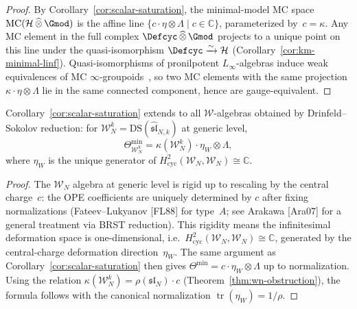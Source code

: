 \begin{proof}
By Corollary~\ref{cor:scalar-saturation}, the minimal-model MC
space $\mathrm{MC}(\mathcal{H} \,\widehat{\otimes}\, \Gmod)$
is the affine line
$\{c \cdot \eta \otimes \Lambda \mid c \in \mathbb{C}\}$,
parameterized by~$c = \kappa$.
Any MC element in the full complex
$\Defcyc \,\widehat{\otimes}\, \Gmod$ projects to a unique point
on this line under the quasi-isomorphism
$\Defcyc \xrightarrow{\sim} \mathcal{H}$
(Corollary~\ref{cor:km-minimal-linf}).
Quasi-isomorphisms of pronilpotent $L_\infty$-algebras induce
weak equivalences of MC $\infty$-groupoids~\cite{Get09},
so two MC elements with the same projection
$\kappa \cdot \eta \otimes \Lambda$ lie in the same connected
component, hence are gauge-equivalent.
\end{proof}

\begin{proposition}
\label{prop:w-algebra-scalar-saturation}
Corollary~\textup{\ref{cor:scalar-saturation}} extends to all
$\mathcal{W}$-algebras obtained by Drinfeld--Sokolov reduction:
for $\mathcal{W}_N^k = \mathrm{DS}(\widehat{\mathfrak{sl}}_{N,k})$
at generic level,
\[
\Theta_{\mathcal{W}_N^k}^{\min}
= \kappa(\mathcal{W}_N^k) \cdot \eta_W \otimes \Lambda,
\]
where $\eta_W$ is the unique generator of
$H^2_{\mathrm{cyc}}(\mathcal{W}_N, \mathcal{W}_N) \cong \mathbb{C}$.
\end{proposition}

\begin{proof}
The $\mathcal{W}_N$ algebra at generic level is rigid up to
rescaling by the central charge~$c$: the OPE coefficients are
uniquely determined by $c$ after fixing normalizations
\textup{(}Fateev--Lukyanov \textup{[}FL88\textup{]} for type~$A$;
see Arakawa \textup{[}Ara07\textup{]} for a general treatment
via BRST reduction\textup{)}.  This rigidity means the
infinitesimal deformation space is one-dimensional, i.e.\
$H^2_{\mathrm{cyc}}(\mathcal{W}_N, \mathcal{W}_N) \cong \mathbb{C}$,
generated by the central-charge deformation direction~$\eta_W$.
The same argument as Corollary~\ref{cor:scalar-saturation} then
gives
$\Theta^{\min} = c \cdot \eta_W \otimes \Lambda$
up to normalization.  Using the relation
$\kappa(\mathcal{W}_N^k) = \rho(\mathfrak{sl}_N) \cdot c$
(Theorem~\ref{thm:wn-obstruction}),
the formula follows with the canonical normalization
$\operatorname{tr}(\eta_W) = 1/\rho$.
\end{proof}

